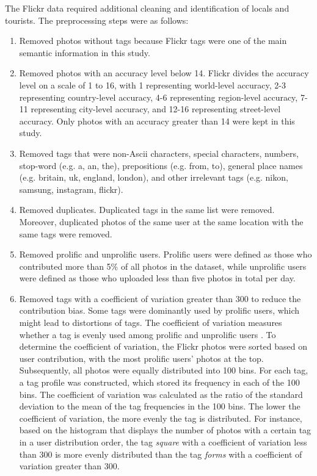 \documentclass{article}
\begin{document}
The Flickr data required additional cleaning and identification of locals and tourists. The preprocessing steps were as follows:
\begin{enumerate}
    \item Removed photos without tags because Flickr tags were one of the main semantic information in this study.
    \item Removed photos with an accuracy level below 14. Flickr divides the accuracy level on a scale of 1 to 16, with 1 representing world-level accuracy, 2-3 representing country-level accuracy, 4-6 representing region-level accuracy, 7-11 representing city-level accuracy, and 12-16 representing street-level accuracy. Only photos with an accuracy greater than 14 were kept in this study.
    \item Removed tags that were non-Ascii characters, special characters, numbers, stop-word (e.g. a, an, the), prepositions (e.g. from, to), general place names (e.g. britain, uk, england, london), and other irrelevant tags (e.g. nikon, samsung, instagram, flickr).
    \item Removed duplicates. Duplicated tags in the same list were removed. Moreover, duplicated photos of the same user at the same location with the same tags were removed.
    \item Removed prolific and unprolific users. Prolific users were defined as those who contributed more than 5\% of all photos in the dataset, while unprolific users were defined as those who uploaded less than five photos in total per day.
    \item Removed tags with a coefficient of variation greater than 300 to reduce the contribution bias. Some tags were dominantly used by prolific users, which might lead to distortions of tags. The coefficient of variation measures whether a tag is evenly used among prolific and unprolific users \cite{hollenstein_exploring_2010}. To determine the coefficient of variation, the Flickr photos were sorted based on user contribution, with the most prolific users' photos at the top. Subsequently, all photos were equally distributed into 100 bins. For each tag, a tag profile was constructed, which stored its frequency in each of the 100 bins. The coefficient of variation was calculated as the ratio of the standard deviation to the mean of the tag frequencies in the 100 bins. The lower the coefficient of variation, the more evenly the tag is distributed. For instance, based on the histogram that displays the number of photos with a certain tag in a user distribution order, the tag \textit{square} with a coefficient of variation less than 300 is more evenly distributed than the tag \textit{forms} with a coefficient of variation greater than 300.

\end{enumerate}
\end{document}
